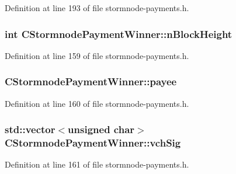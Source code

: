 Definition at line 193 of file stormnode-\/payments.\+h.

\hypertarget{class_c_stormnode_payment_winner_a22c766c132714906e267465def62cbcd}{}
\subsubsection[{n\+Block\+Height}]{\setlength{\rightskip}{0pt plus 5cm}int C\+Stormnode\+Payment\+Winner\+::n\+Block\+Height}\label{class_c_stormnode_payment_winner_a22c766c132714906e267465def62cbcd}


Definition at line 159 of file stormnode-\/payments.\+h.

\hypertarget{class_c_stormnode_payment_winner_abbba3ee9d4620fcec320826f03ffc7e4}{}
\subsubsection[{payee}]{ C\+Stormnode\+Payment\+Winner\+::payee}\label{class_c_stormnode_payment_winner_abbba3ee9d4620fcec320826f03ffc7e4}


Definition at line 160 of file stormnode-\/payments.\+h.

\hypertarget{class_c_stormnode_payment_winner_a2a689114ee80f528238760a5ae3bdcb9}{}
\subsubsection[{vch\+Sig}]{\setlength{\rightskip}{0pt plus 5cm}std\+::vector$<$unsigned char$>$ C\+Stormnode\+Payment\+Winner\+::vch\+Sig}\label{class_c_stormnode_payment_winner_a2a689114ee80f528238760a5ae3bdcb9}


Definition at line 161 of file stormnode-\/payments.\+h.

\hypertarget{class_c_stormnode_payment_winner_a6514e77cb8997131c47e39b3118606fa}{}
